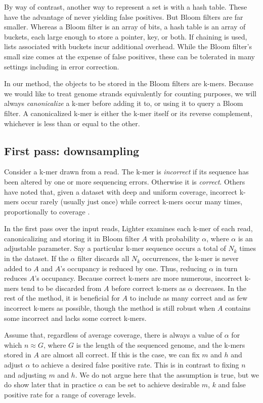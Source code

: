 \documentclass[10pt]{article}
\begin{document}
By way of contrast, another way to represent a set is with a hash table.  These have the advantage of never yielding false positives.  But Bloom filters are far smaller.  Whereas a Bloom filter is an array of bits, a hash table is an array of buckets, each large enough to store a pointer, key, or both.  If chaining is used, lists associated with buckets incur additional overhead.  While the Bloom filter's small size comes at the expense of false positives, these can be tolerated in many settings including in error correction.

In our method, the objects to be stored in the Bloom filters are k-mers.  Because we would like to treat genome strands equivalently for counting purposes, we will always \emph{canonicalize} a k-mer before adding it to, or using it to query a Bloom filter.  A canonicalized k-mer is either the k-mer itself or its reverse complement, whichever is less than or equal to the other.

\subsection*{First pass: downsampling}

Consider a k-mer drawn from a read.  The k-mer is \emph{incorrect} if its sequence has been altered by one or more sequencing errors.  Otherwise it is \emph{correct}.  Others have noted that, given a dataset with deep and uniform coverage, incorrect k-mers occur rarely (usually just once) while correct k-mers occur many times, proportionally to coverage \cite{pevzner2001eulerian, chaisson2004fragment}.

In the first pass over the input reads, Lighter examines each k-mer of each read, canonicalizing and storing it in Bloom filter $A$ with probability $\alpha$, where $\alpha$ is an adjustable parameter.  Say a particular k-mer sequence occurs a total of $N_k$ times in the dataset.  If the $\alpha$ filter discards all $N_k$ occurrences, the k-mer is never added to $A$ and $A$'s occupancy is reduced by one.  Thus, reducing $\alpha$ in turn reduces $A$'s occupancy.  Because correct k-mers are more numerous, incorrect k-mers tend to be discarded from $A$ before correct k-mers as $\alpha$ decreases.  In the rest of the method, it is beneficial for $A$ to include as many correct and as few incorrect k-mers as possible, though the method is still robust when $A$ contains some incorrect and lacks some correct k-mers.

Assume that, regardless of average coverage, there is always a value of $\alpha$ for which $n \approx G$, where $G$ is the length of the sequenced genome, and the k-mers stored in $A$ are almost all correct.  If this is the case, we can fix $m$ and $h$ and adjust $\alpha$ to achieve a desired false positive rate.  This is in contrast to fixing $n$ and adjusting $m$ and $h$.  We do not argue here that the assumption is true, but we do show later that in practice $\alpha$ can be set to achieve desirable $m$, $k$ and false positive rate for a range of coverage levels.
\end{document}
